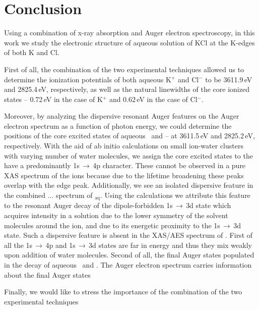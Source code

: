 \section{Conclusion}\label{sec:concl}

Using a combination of x-ray absorption and Auger electron spectroscopy, in this work we study the electronic structure of aqueous solution of KCl at the K-edges of both K and Cl.

First of all, the combination of the two experimental techniques allowed us to determine the ionization potentials of both aqueous K$^{+}$ and Cl$^{-}$ to be 3611.9\,eV and 2825.4\,eV, respectively, as well as the natural linewidths of the core ionized states -- 0.72\,eV in the case of K$^{+}$ and 0.62\,eV in the case of Cl$^{-}$.

Moreover, by analyzing the dispersive resonant Auger features on the Auger electron spectrum as a function of photon energy, we could determine the positions of the core excited states of aqueous \ki~and \cli -- at 3611.5\,eV and 2825.2\,eV, respectively. With the aid of ab initio calculations on small ion-water clusters with varying number of water molecules, we assign the core excited states to the have a predominantly 1s$\,\rightarrow\,$4p character. These cannot be observed in a pure XAS spectrum of the ions because due to the lifetime broadening these peaks overlap with the edge peak. Additionally, we see an isolated dispersive feature in the combined ... spectrum of \ki$_\text{aq}$. Using the calculations we attribute this feature to the resonant Auger decay of the dipole-forbidden 1s$\,\rightarrow\,$3d state which acquires intensity in a solution due to the lower symmetry of the solvent molecules around the ion, and due to its energetic proximity to the 1s$\,\rightarrow\,$3d state. Such a dispersive feature is absent in the XAS/AES spectrum of \cli. First of all the 1s$\,\rightarrow\,$4p and 1s$\,\rightarrow\,$3d states are far in energy and thus they mix weakly upon addition of water molecules. Second of all, the final Auger states populated in the decay of aqueous \ki~and \cli. The Auger electron spectrum carries information about the final Auger states


Finally, we would like to stress the importance of the combination of the two experimental techniques